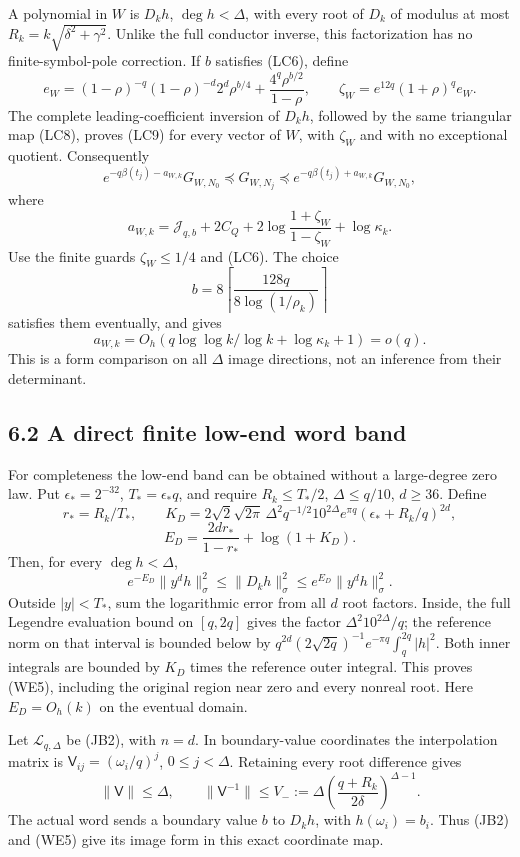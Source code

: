 \documentclass[10pt]{article}
\begin{document}
A polynomial in \(W\) is \(D_kh\), \(\deg h<\Delta\), with every root of \(D_k\) of modulus at most \(R_k=k\sqrt{\delta^2+\gamma^2}\). Unlike the full conductor inverse, this factorization has no finite-symbol-pole correction. If \(b\) satisfies (LC6), define \[
 e_W=(1-\rho)^{-q}(1-\rho)^{-d}2^d\rho^{b/4}
       +\frac{4^q\rho^{b/2}}{1-\rho},
 \qquad
 \zeta_W=e^{12q}(1+\rho)^q e_W.
 \tag{WE1}
\] The complete leading-coefficient inversion of \(D_kh\), followed by the same triangular map (LC8), proves (LC9) for every vector of \(W\), with \(\zeta_W\) and with no exceptional quotient. Consequently \[
 \boxed{e^{-q\beta(t_j)-a_{W,k}}G_{W,N_0}
 \preceq G_{W,N_j}
 \preceq e^{-q\beta(t_j)+a_{W,k}}G_{W,N_0},}
 \tag{WE2}
\] where \[
 a_{W,k}=\mathcal J_{q,b}+2C_Q
 +2\log\frac{1+\zeta_W}{1-\zeta_W}+\log\kappa_k.
\] Use the finite guards \(\zeta_W\le1/4\) and (LC6). The choice \[
 b=8\left\lceil\frac{128q}{8\log(1/\rho_k)}\right\rceil
 \tag{WE3}
\] satisfies them eventually, and gives \[
 a_{W,k}=O_h(q\log\log k/\log k+\log\kappa_k+1)=o(q).
\] This is a form comparison on all \(\Delta\) image directions, not an inference from their determinant.

\subsection{6.2 A direct finite low-end word band}\label{a-direct-finite-low-end-word-band}

For completeness the low-end band can be obtained without a large-degree zero law. Put \(\epsilon_*=2^{-32}\), \(T_* =\epsilon_*q\), and require \(R_k\le T_*/2\), \(\Delta\le q/10\), \(d\ge36\). Define \[
 r_*=R_k/T_*,\qquad
 K_D=2\sqrt2\sqrt{2\pi}\,\Delta^2q^{-1/2}
 10^{2\Delta}e^{\pi q}
 (\epsilon_*+R_k/q)^{2d},
\] \[
 E_D=\frac{2dr_*}{1-r_*}+\log(1+K_D).
 \tag{WE4}
\] Then, for every \(\deg h<\Delta\), \[
 \boxed{e^{-E_D}\|y^dh\|_\sigma^2
 \le\|D_kh\|_\sigma^2\le e^{E_D}\|y^dh\|_\sigma^2.}
 \tag{WE5}
\] Outside \(|y|<T_*\), sum the logarithmic error from all \(d\) root factors. Inside, the full Legendre evaluation bound on \([q,2q]\) gives the factor \(\Delta^2 10^{2\Delta}/q\); the reference norm on that interval is bounded below by \(q^{2d}(2\sqrt{2q})^{-1}e^{-\pi q}\int_q^{2q}|h|^2\). Both inner integrals are bounded by \(K_D\) times the reference outer integral. This proves (WE5), including the original region near zero and every nonreal root. Here \(E_D=O_h(k)\) on the eventual domain.

Let \(\mathcal L_{q,\Delta}\) be (JB2), with \(n=d\). In boundary-value coordinates the interpolation matrix is \(\mathsf V_{ij}=(\omega_i/q)^j\), \(0\le j<\Delta\). Retaining every root difference gives \[
 \|\mathsf V\|\le\Delta,
 \qquad\|\mathsf V^{-1}\|\le
 V_-:=\Delta\left(\frac{q+R_k}{2\delta}\right)^{\Delta-1}.
\] The actual word sends a boundary value \(b\) to \(D_kh\), with \(h(\omega_i)=b_i\). Thus (JB2) and (WE5) give its image form in this exact coordinate map.
\end{document}
